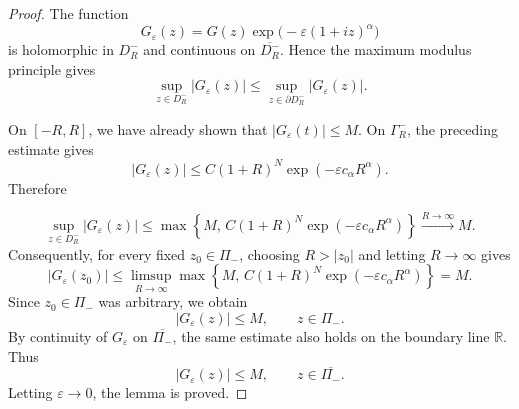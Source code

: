 \documentclass[12pt]{amsart}
\theoremstyle{definition}
\newcommand{\ep}{\varepsilon}
\begin{document}
\begin{proof}
The function
\[
        G_\varepsilon(z)
        =
        G(z)\exp\bigl(-\varepsilon(1+iz)^\alpha\bigr)
\]
is holomorphic in \(D_R^-\) and continuous on \(\overline{D_R^-}\). Hence the
maximum modulus principle gives
\[
        \sup_{z\in D_R^-}|G_\varepsilon(z)|
        \le
        \sup_{z\in \partial D_R^-}|G_\varepsilon(z)|.
\]

On \([-R,R]\), we have already shown that \(|G_\varepsilon(t)|\le M.\) 
On \(\Gamma_R^-\), the preceding estimate gives
\[
        |G_\varepsilon(z)|
        \le
        C(1+R)^N\exp(-\varepsilon c_\alpha R^\alpha).
\]
Therefore

        \[\sup_{z\in D_R^-}|G_\varepsilon(z)|
        \le
        \max\left\{
            M,\,
            C(1+R)^N\exp(-\varepsilon c_\alpha R^\alpha)
        \right\}\xrightarrow{R\to \infty}M.
        \]
Consequently, for every fixed \(z_0\in \Pi_-\), choosing \(R>|z_0|\) and
letting \(R\to\infty\) gives
\[
        |G_\varepsilon(z_0)|
        \le
        \limsup_{R\to\infty}
        \max\left\{
            M,\,
            C(1+R)^N\exp(-\varepsilon c_\alpha R^\alpha)
        \right\}
        =
        M.
\]
Since \(z_0\in \Pi_-\) was arbitrary, we obtain
\[
        |G_\varepsilon(z)|\le M,
        \qquad z\in \Pi_-.
\]
By continuity of \(G_\varepsilon\) on \(\overline{\Pi_-}\), the same estimate
also holds on the boundary line \(\mathbb R\). Thus
\[
        |G_\varepsilon(z)|\le M,
        \qquad z\in \overline{\Pi_-}.
\]
Letting $\ep\to 0$, the lemma is proved. 
\end{proof}
\end{document}

